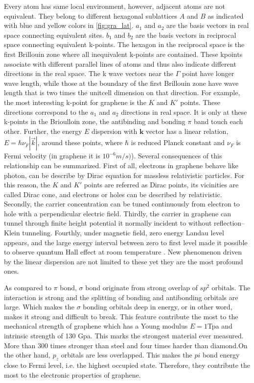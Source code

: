 Every atom has same local environment, however, adjacent atoms are not equivalent. They belong to different hexagonal sublattices $A$ and $B$ as indicated with blue and yellow colors in \autoref{fig:gra_lat}. $a_1$ and $a_2$ are the basis vectors in real space connecting equivalent sites. $b_1$ and $b_2$ are the basis vectors in reciprocal space connecting equivalent k-points. The hexagon in the reciprocal space is the first Brillouin zone where all inequivalent k-points are contained. These kpoints associate with different parallel lines of atoms and thus also indicate different directions in the real space. The k wave vectors near the $\Gamma$ point have longer wave length, while those at the boundary of the first Brillouin zone have wave length that is two times the unitcell dimension on that direction. For example, the most interesting k-point for graphene is the $K$ and $K'$ points. These directions correspond to the $a_1$ and $a_2$ directions in real space. It is only at these k-points in the Brioulloin zone, the antibinding and bonding $\pi$ band touch each other. Further, the energy $E$ dispersion with $\textbf{k}$ vector has a linear relation, $ E = \hbar \nu_F |\vec{k}|$, around these points, where $\hbar$ is reduced Planck constant and $\nu_F$ is Fermi velocity (in graphene it is $10^{-6}m/s)$).  Several consequences of this relationship can be summarized. First of all, electrons in graphene behave like photon, can be describe by Dirac equation for massless relativistic particles\cite{Novoselov2005}. For this reason, the $K$ and $K'$ points are referred as Dirac points, its vicinities are called Dirac cone, and electrons or holes can be described by relativistic. Secondly, the carrier concentration can be tuned continuously from electron to hole with a perpendicular electric field\cite{Geim2007}. Thirdly, the carrier in graphene can tunnel through finite height potential it normally incident to without reflection--Klein tunneling\cite{Katsnelson2006}. Fourthly, under magnetic field, zero energy Landau level appears, and the large energy interval between zero to first level made it possible to observe quantum Hall effect at room temperature \cite{Novoselov1379}. New phenomenon driven by the linear dispersion are not limited to these yet they are the most profound ones.




As compared to $\pi$ bond, $\sigma$ bond originate from strong overlap of $sp^2$ orbitals. The interaction is strong and the splitting of bonding and antibonding orbitals are large. Which makes the $\sigma$ bonding orbitals deep in energy, or in other word, makes it strong and difficult to break. This feature contribute the most to the mechanical strength of graphene which has a Young modulus $E = 1$Tpa and intrinsic strength of 130 Gpa\cite{Lee385}. This marks the strongest material ever measured. More than 300 times stronger than steel and four times harder than diamond.On the other hand, $p_z$ orbitals are less overlapped. This makes the $pi$ bond energy close to Fermi level, i.e. the highest occupied state. Therefore, they contribute the most to the electronic properties of graphene.  

